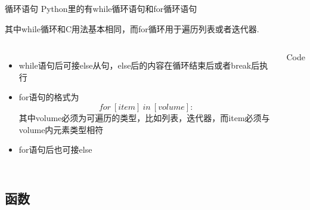 \documentclass[xcolor=dvipsnames, 9pt]{beamer}
\newenvironment{code}{\begin{semiverbatim} \begin{footnotesize}}{\end{footnotesize}\end{semiverbatim}}
\begin{document}
\begin{frame}[fragile]{循环语句}
	Python里的有while循环语句和for循环语句

	其中while循环和C用法基本相同，而for循环用于遍历列表或者迭代器.
	\begin{columns}
		\begin{itemize}
			\item<2-> while语句后可接else从句，else后的内容在循环结束后或者break后执行
				\vspace{0.1cm}
			\item<5-> for语句的格式为$$for\ [item]\ in\ [volume]:$$其中volume必须为可遍历的类型，比如列表，迭代器，而item必须与volume内元素类型相符 
				\vspace{0.1cm}
			\item<6-> for语句后也可接else
		\end{itemize}
		\begin{block}{Code}\begin{code}




		\end{code}\end{block}
	\end{columns}
\end{frame}

\subsection{函数}
\end{document}
